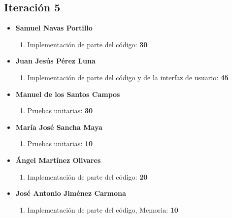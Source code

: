 \documentclass[11 pt]{book}
\begin{document}
		\subsection*{Iteración 5}
		    \begin{itemize}
			    \item \textbf {Samuel Navas Portillo}
				    \begin{enumerate}
					    \item Implementación de parte del código: \textbf{30}
				    \end{enumerate}
			    \item \textbf {Juan Jesús Pérez Luna}
				    \begin{enumerate}
					    \item Implementación de parte del código y de la interfaz de usuario: \textbf{45}
				    \end{enumerate}
			    \item \textbf {Manuel de los Santos Campos}
				    \begin{enumerate}
					    \item Pruebas unitarias: \textbf{30}
				    \end{enumerate}
			    \item \textbf {María José Sancha Maya}
				    \begin{enumerate}
					    \item Pruebas unitarias: \textbf{10}
				    \end{enumerate}
			    \item \textbf {Ángel Martínez Olivares}
				    \begin{enumerate}
					    \item Implementación de parte del código: \textbf{20}
				    \end{enumerate}
			    \item \textbf {José Antonio Jiménez Carmona}
				    \begin{enumerate}
					    \item Implementación de parte del código, Memoria: \textbf{10}
				    \end{enumerate}
		    \end{itemize}
		    
\end{document}
